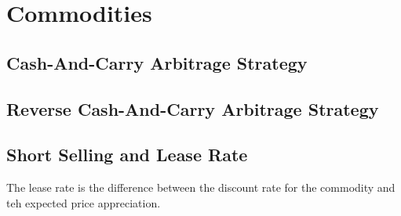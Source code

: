 \chapter{Commodities}

\section{Cash-And-Carry Arbitrage Strategy}


\section{Reverse Cash-And-Carry Arbitrage Strategy}


\section{Short Selling and Lease Rate}
The lease rate is the difference between the discount rate for the commodity and teh expected price appreciation.